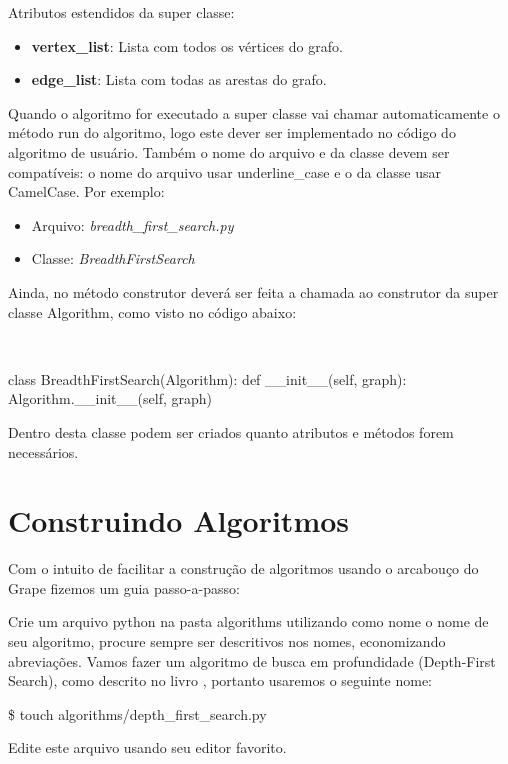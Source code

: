 \documentclass[a4paper]{abnt}
\begin{document}
Atributos estendidos da super classe:

\begin{itemize}
    \item \textbf{vertex\_list}: Lista com todos os vértices do grafo.
    \item \textbf{edge\_list}: Lista com todas as arestas do grafo.
\end{itemize}

Quando o algoritmo for executado a super classe vai chamar automaticamente o método run do algoritmo, logo este dever ser implementado no código do algoritmo de usuário. Também o nome do arquivo e da classe devem ser compatíveis: o nome do arquivo usar underline\_case e o da classe usar CamelCase. Por exemplo:

\begin{itemize}
    \item Arquivo: \textit{breadth\_first\_search.py}
    \item Classe: \textit{BreadthFirstSearch}
\end{itemize}

Ainda, no método construtor deverá ser feita a chamada ao construtor da super classe Algorithm, como visto no código abaixo:

\\
\begin{python}
class BreadthFirstSearch(Algorithm):
    def __init__(self, graph):
        Algorithm.__init__(self, graph)
\end{python}

Dentro desta classe podem ser criados quanto atributos e métodos forem necessários.

\section{Construindo Algoritmos}

Com o intuito de facilitar a construção de algoritmos usando o arcabouço do Grape fizemos um guia passo-a-passo:

Crie um arquivo python na pasta algorithms utilizando como nome o nome de seu algoritmo, procure sempre ser descritivos nos nomes, economizando abreviações. Vamos fazer um algoritmo de busca em profundidade (Depth-First Search), como descrito no livro \cite{cormen}, portanto usaremos o seguinte nome:

\$ touch algorithms/depth\_first\_search.py

Edite este arquivo usando seu editor favorito.
\end{document}
